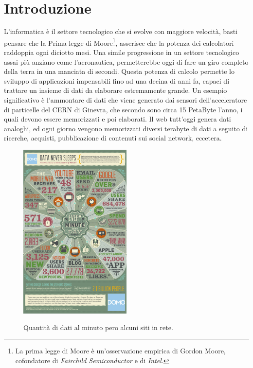
\chapter{Introduzione}
L'informatica è il settore tecnologico che si evolve con maggiore velocità, basti pensare che la Prima legge di Moore\footnote{La prima legge di Moore è un'osservazione empirica di Gordon Moore, cofondatore di \emph{Fairchild Semiconductor} e di \emph{Intel}.}, asserisce che la potenza dei calcolatori raddoppia ogni diciotto mesi. Una simile progressione in un settore tecnologico assai più anziano come l'aeronautica, permetterebbe oggi di fare un giro completo della terra in una manciata di secondi. Questa potenza di calcolo permette lo sviluppo di applicazioni impensabili fino ad una decina di anni fa, capaci di trattare un insieme di dati da elaborare estremamente grande. Un esempio significativo è l'ammontare di dati che viene generato dai sensori dell'acceleratore di particelle del CERN di Ginevra,  che secondo \cite{pres_cern} sono circa 15 PetaByte l'anno, i quali devono essere memorizzati e poi elaborati. Il web tutt'oggi genera dati analoghi, ed ogni giorno vengono memorizzati diversi terabyte di dati a seguito di ricerche, acquisti, pubblicazione di contenuti sui social network, eccetera. 
\begin{figure}
	\centering
	\includegraphics[width=0.50\textwidth]{Data-in-One-Minute.jpg}
	\label{data_per_minute}
	\caption{Quantità di dati al minuto pero alcuni siti in rete.}
\end{figure}
